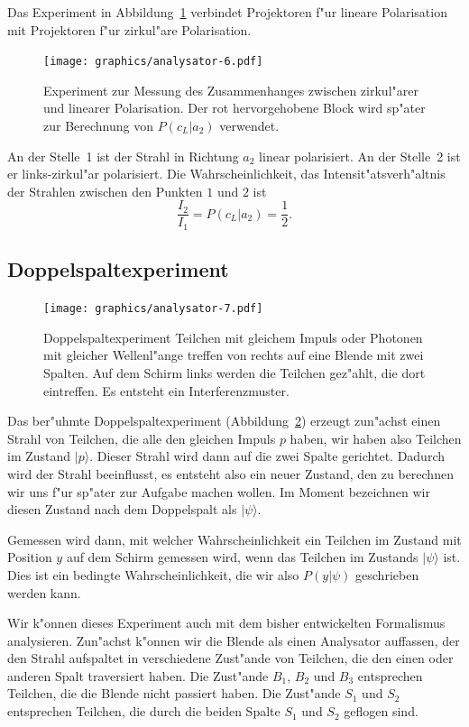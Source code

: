 Das Experiment in Abbildung~\ref{skript:linear-zirkulaer} verbindet
Projektoren f"ur lineare Polarisation mit Projektoren f"ur zirkul"are
Polarisation.
\begin{figure}
\centering
\texttt{[image: graphics/analysator-6.pdf]}
\caption{Experiment zur Messung des Zusammenhanges zwischen zirkul"arer
und linearer Polarisation. Der rot hervorgehobene Block wird sp"ater
zur Berechnung von $P(c_L|a_2)$ verwendet.
\label{skript:linear-zirkulaer}}
\end{figure}
An der Stelle~1 ist der Strahl in Richtung $a_2$ linear polarisiert.
An der Stelle~2 ist er links-zirkul"ar polarisiert. Die Wahrscheinlichkeit,
das Intensit"atsverh"altnis der Strahlen zwischen den Punkten $1$ und $2$
ist
\begin{equation}
\frac{I_2}{I_1}=P(c_L|a_2)=\frac12.
\label{skript:intensitaetsverhaeltnis}
\end{equation}

\subsection{Doppelspaltexperiment}
%
\begin{figure}
\centering
\texttt{[image: graphics/analysator-7.pdf]}
\caption{Doppelspaltexperiment Teilchen mit gleichem Impuls oder Photonen
mit gleicher Wellenl"ange treffen von rechts auf eine Blende mit zwei
Spalten. Auf dem Schirm links werden die Teilchen gez"ahlt, die dort
eintreffen. Es entsteht ein Interferenzmuster.
\label{skript:doppelspalt-bild}}
\end{figure}
Das ber"uhmte Doppelspaltexperiment (Abbildung~\ref{skript:doppelspalt-bild})
erzeugt zun"achst einen Strahl
von Teilchen, die alle den gleichen Impuls $p$ haben, wir haben also
Teilchen im Zustand $|p\rangle$. Dieser Strahl
wird dann auf die zwei Spalte gerichtet. Dadurch wird der Strahl
beeinflusst, es entsteht also ein neuer Zustand, den zu berechnen
wir uns f"ur sp"ater zur Aufgabe machen wollen.
Im Moment bezeichnen wir diesen Zustand nach dem Doppelspalt 
als $|\psi\rangle$.

Gemessen wird dann, mit welcher Wahrscheinlichkeit
ein Teilchen im Zustand mit Position $y$ auf dem Schirm
gemessen wird, wenn das Teilchen im Zustands $|\psi\rangle$
ist. Dies ist ein bedingte Wahrscheinlichkeit, die wir also
$P(y|\psi)$ geschrieben werden kann.

Wir k"onnen dieses Experiment auch mit dem bisher entwickelten
Formalismus analysieren.
Zun"achst k"onnen wir die Blende als einen Analysator auffassen, der
den Strahl aufspaltet in verschiedene Zust"ande von Teilchen, die
den einen oder anderen Spalt traversiert haben.
Die Zust"ande $B_1$, $B_2$ und $B_3$ entsprechen Teilchen, die die
Blende nicht passiert haben. Die Zust"ande $S_1$ und $S_2$ entsprechen
Teilchen, die durch die beiden Spalte $S_1$ und $S_2$ geflogen sind.

